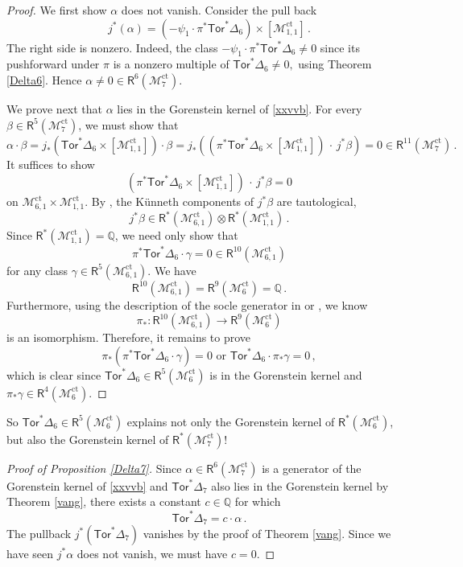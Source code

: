 \documentclass[11pt]{amsart}
\theoremstyle{definition}
\newcommand{\R}{\mathsf{R}}
\newcommand{\M}{\mathcal{M}}
\DeclareMathOperator{\ct}{ct}
\newcommand{\Tor}{\mathsf{Tor}}
\begin{document}
{\begin{proof} We first show $\alpha$  does not vanish. Consider the pull back
$$j^*(\alpha) = (-\psi_1 \cdot \pi^*\Tor^*\Delta_6) \times [\M_{1,1}^{\ct}]\, .$$
The right side is 
nonzero. Indeed, the class $-\psi_1\cdot \pi^*\Tor^*\Delta_6\neq 0$ since its pushforward under $\pi$ is a nonzero multiple of $\Tor^*\Delta_6\neq 0,$ using Theorem \ref{Delta6}. 
Hence $\alpha \neq 0
\in \R^6(\M_7^{\ct})$. 


    
   We prove next that
   $\alpha$ lies in the
   Gorenstein kernel of \eqref{xxvvb}.
   For every $\beta\in \R^5(\M_7^{\ct})$, we must show that $$\alpha\cdot \beta = j_*(\Tor^*\Delta_6\times [\M_{1,1}^{\ct}])\cdot \beta=j_*((\pi^*\Tor^*\Delta_6\times [\M_{1,1}^{\ct}])\, \cdot\,  j^*\beta) = 0 \in \mathsf{R}^{11}(\M_7^{\ct})\,.$$
   It suffices to show $$(\pi^*\Tor^*\Delta_6\times [\M_{1,1}^{\ct}] )\, \cdot\,  j^*\beta=0$$
   on $\M_{6,1}^{\ct}\times \M_{1,1}^{\ct}$. By \cite[Propositon 12]{GP}, the K\"unneth components of $j^*\beta$ are tautological, $$j^*\beta\in \R^*(\M_{6, 1}^{\ct})\otimes \R^*(\M_{1, 1}^{\ct})\,.$$ Since $\R^*(\M_{1, 1}^{\ct})=\mathbb Q$, we need only show that $$\pi^*\Tor^*\Delta_6\cdot \gamma=0\in \R^{10}(\M_{6, 1}^{\ct})$$ for any class $\gamma\in \R^5(\M_{6, 1}^{\ct}).$ We have 
$$\R^{10}(\M_{6, 1}^{\ct})=\R^9(\M_6^{\ct})=\mathbb Q\,.$$  Furthermore, using the description of the socle generator in \cite[Section 4.1.2]{FP2} or \cite[Section 5.6]{GV}, we know $$\pi_*:\R^{10}(\M_{6, 1}^{\ct})\to \R^9(\M_6^{\ct})$$
is an isomorphism. Therefore, it remains to prove $$\pi_*(\pi^*\Tor^*\Delta_6\cdot \gamma)=0 \text{ or } \Tor^*\Delta_6\cdot \pi_*\gamma=0\, ,$$ which is clear since $\Tor^*\Delta_6\in \R^5(\M_6^{\ct})$ is in the Gorenstein kernel and $\pi_*\gamma\in \R^4(\M_6^{\ct}).$
\end{proof}



So
$\Tor^*\Delta_6\in \mathsf{R}^5(\M_6^{\ct})$ explains
not only the Gorenstein kernel of
$\mathsf{R}^*(\M_6^{\ct})$, but also
the Gorenstein kernel of $\mathsf{R}^*(\M_7^{\ct})$!

\begin{proof}[Proof of Proposition \ref{Delta7}] Since 
$\alpha\in \R^6(\M_7^{\ct})$
is a generator of the
Gorenstein kernel of \eqref{xxvvb} and $\Tor^*\Delta_7$ also lies in the Gorenstein kernel by Theorem \ref{vang}, there exists a constant $c\in \mathbb{Q}$ for which  \begin{equation}\label{l}\Tor^*\Delta_7=c\cdot \alpha\,.\end{equation}
The pullback $j^*(\Tor^*\Delta_7)$  vanishes by the proof of Theorem \ref{vang}.
Since we have
seen $j^*\alpha$
does not vanish,
we must have $c=0$.
\end{proof}

}
\end{document}
